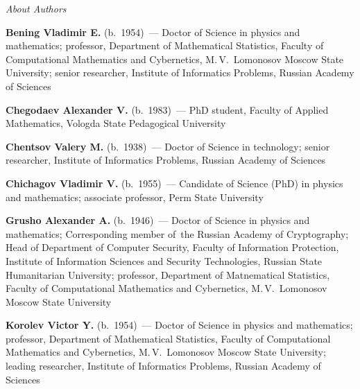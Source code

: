 \vspace*{-48pt}
\begin{center}\LARGE
\textit{About Authors}
\end{center}
\thispagestyle{empty}

\vspace*{36pt} %


\begin{multicols}{2}

\noindent
\textbf{Bening Vladimir E.} (b.\ 1954)~--- Doctor of Science in physics and 
mathematics; professor, Department of Mathematical Statistics, Faculty of Computational 
Mathematics and Cybernetics, M.\,V.~Lomonosov Moscow State University; senior researcher, Institute of 
Informatics Problems, Russian Academy of Sciences
{

}

\vspace*{6pt}

\noindent
\textbf{Chegodaev Alexander V.} (b.\ 1983)~--- PhD student, Faculty of 
Applied Mathematics, Vologda State Pedagogical University

\vspace*{6pt}

\noindent
\textbf{Chentsov Valery M.} (b.\ 1938)~--- Doctor of Science in technology; 
senior researcher, Institute of Informatics Problems, Russian Academy of Sciences

\vspace*{6pt}

\noindent
\textbf{Chichagov Vladimir V.} (b.\ 1955)~--- Candidate of Science (PhD) in 
physics and mathematics; associate professor, Perm State University

\vspace*{6pt}

\noindent
\textbf{Grusho Alexander A.} (b.\ 1946)~--- Doctor of Science in physics and 
mathematics; Corresponding member of\ the Russian Academy of Cryptography; Head of 
Department of Computer Security, Faculty of Information Protection, Institute of Information 
Sciences and Security Technologies, Russian State Humanitarian University; professor, 
Department of Matnematical Statistics, Faculty of Computational Mathematics and Cybernetics, 
M.\,V.~Lomonosov Moscow State University
{

}

\vspace*{6pt}

\noindent
\textbf{Korolev Victor Y.} (b.\ 1954)~--- Doctor of Science in physics and 
mathematics; professor, Department of Mathematical Statistics, Faculty of Computational 
Mathematics and Cybernetics, M.\,V.~Lomonosov Moscow State University; leading researcher, Institute of 
Informatics Problems, Russian Academy of Sciences
{

}
\end{multicols}
